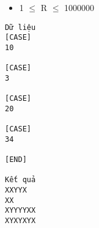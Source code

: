 \begin{itemize}
	\item     1  $\le$  R  $\le$  1000000   
\end{itemize}
\begin{verbatim}
Dữ liệu
[CASE]
10

[CASE]
3

[CASE]
20

[CASE]
34

[END]

Kết quả
XXYYX
XX
XYYYYXX
XYXYXYX
\end{verbatim}